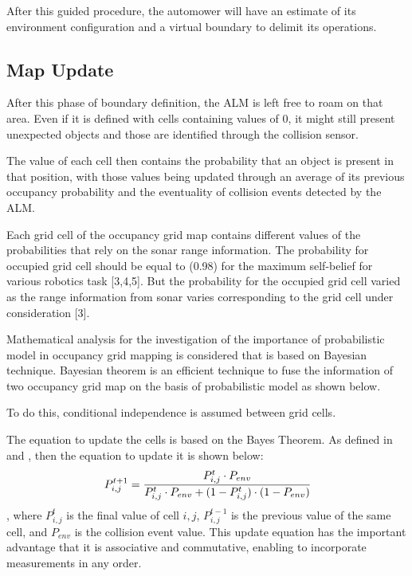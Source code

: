 After this guided procedure, the automower will have an estimate of its environment configuration and a virtual boundary to delimit its operations.

\subsection{Map Update}
\noindent
After this phase of boundary definition, the \gls{ALM} is left free to roam on that area.
Even if it is defined with cells containing values of $0$, it might still present unexpected objects and those are identified through the collision sensor.

The value of each cell then contains the probability that an object is present in that position, with those values being updated through an average of its previous occupancy probability and the eventuality of collision events detected by the \gls{ALM}.

Each grid cell of the occupancy grid map contains different values of the probabilities that rely on the sonar range information. The probability for occupied grid cell should be equal to (0.98) for the maximum self-belief for various robotics task [3,4,5]. But the probability for the occupied grid cell varied as the range information from sonar varies corresponding to the grid cell under consideration [3].

Mathematical analysis for the investigation of the importance of probabilistic model in occupancy grid mapping is considered that is based on Bayesian technique. Bayesian theorem is an efficient technique to fuse the information of two occupancy grid map on the basis of probabilistic model as shown below.

To do this, conditional independence is assumed between grid cells.


The equation to update the cells is based on the Bayes Theorem.
As defined in \cite{joubert2012adaptive} and \cite{singh_sonar_2019}, then the equation to update it is shown below:
\begin{equation}
    P_{i,j}^{t+1} = \cfrac{P_{i,j}^{t} \cdot P_{env}}{P_{i,j}^{t} \cdot P_{env} + (1-P_{i,j}^{t}) \cdot (1-P_{env})}
\end{equation}
, where $P_{i,j}^{t}$ is the final value of cell $i,j$, $P_{i,j}^{t-1}$ is the previous value of the same cell, and $P_{env}$ is the collision event value.
{\tiny }
This update equation has the important advantage that it is associative and commutative, enabling to incorporate measurements in any order.

